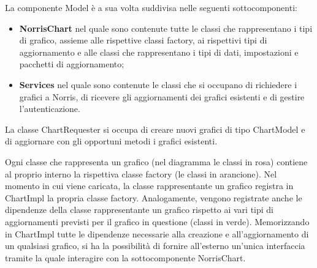 La componente Model è a sua volta suddivisa nelle seguenti sottocomponenti:
\begin{itemize}
\item \textbf{NorrisChart} nel quale sono contenute tutte le classi che rappresentano i tipi di grafico, assieme alle rispettive classi factory, ai rispettivi tipi di aggiornamento e alle classi che rappresentano i tipi di dati, impostazioni e pacchetti di aggiornamento; 
\item \textbf{Services} nel quale sono contenute le classi che si occupano di richiedere i grafici a Norris, di ricevere gli aggiornamenti dei grafici esistenti e di gestire l'autenticazione.
\end{itemize}

La classe ChartRequester si occupa di creare nuovi grafici di tipo ChartModel e di aggiornare con gli opportuni metodi i grafici esistenti.

Ogni classe che rappresenta un grafico (nel diagramma le classi in rosa) contiene al proprio interno la rispettiva classe factory (le classi in arancione). Nel momento in cui viene caricata, la classe rappresentante un grafico registra in ChartImpl la propria classe factory. Analogamente, vengono registrate anche le dipendenze della classe rappresentante un grafico rispetto ai vari tipi di aggiornamenti previsti per il grafico in questione (classi in verde). Memorizzando in ChartImpl tutte le dipendenze necessarie alla creazione e all'aggiornamento di un qualsiasi grafico, si ha la possibilità di fornire all'esterno un'unica interfaccia tramite la quale interagire con la sottocomponente NorrisChart.

